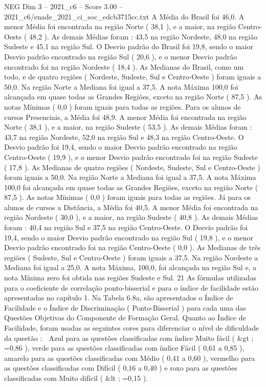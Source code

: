 \begin{textsample}{NEG Dim 3 – 2021\_c6 – Score 3.00 – 2021\_c6/enade\_2021\_ci\_soc\_edcb3715cc.txt}
A Média do Brasil foi 46,0.
A menor Média foi encontrada na região Norte ( 38,1 ), e a maior, na região Centro-Oeste ( 48,2 ).
As demais Médias foram : 43,5 na região Nordeste, 48,0 na região Sudeste e 45,1 na região Sul.
O Desvio padrão do Brasil foi 19,8, sendo o maior Desvio padrão encontrado na região Sul ( 20,6 ), e o menor Desvio padrão encontrado foi na região Nordeste ( 18,4 ).
As Medianas do Brasil, como um todo, e de quatro regiões ( Nordeste, Sudeste, Sul e Centro-Oeste ) foram iguais a 50,0.
Na região Norte a Mediana foi igual a 37,5.
A nota Máxima 100,0 foi alcançada em quase todas as Grandes Regiões, exceto na região Norte ( 87,5 ).
As notas Mínimas ( 0,0 ) foram iguais para todas as regiões.
Para os alunos de cursos Presenciais, a Média foi 48,9.
A menor Média foi encontrada na região Norte ( 38,1 ), e a maior, na região Sudeste ( 53,5 ).
As demais Médias foram : 43,7 na região Nordeste, 52,0 na região Sul e 48,3 na região Centro-Oeste.
O Desvio padrão foi 19,4, sendo o maior Desvio padrão encontrado na região Centro-Oeste ( 19,9 ), e o menor Desvio padrão encontrado foi na região Sudeste ( 17,8 ).
As Medianas de quatro regiões ( Nordeste, Sudeste, Sul e Centro-Oeste ) foram iguais a 50,0.
Na região Norte a Mediana foi igual a 37,5.
A nota Máxima 100,0 foi alcançada em quase todas as Grandes Regiões, exceto na região Norte ( 87,5 ).
As notas Mínimas ( 0,0 ) foram iguais para todas as regiões.
Já para os alunos de cursos a Distância, a Média foi 40,5.
A menor Média foi encontrada na região Nordeste ( 30,0 ), e a maior, na região Sudeste ( 40,8 ).
As demais Médias foram : 40,4 na região Sul e 37,5 na região Centro-Oeste.
O Desvio padrão foi 19,4, sendo o maior Desvio padrão encontrado na região Sul ( 19,8 ), e o menor Desvio padrão encontrado foi na região Centro-Oeste ( 0,0 ).
As Medianas de três regiões ( Sudeste, Sul e Centro-Oeste ) foram iguais a 37,5.
Na região Nordeste a Mediana foi igual a 25,0.
A nota Máxima, 100,0, foi alcançada na região Sul e, a nota Mínima zero foi obtida nas regiões Sudeste e Sul. 21 As fórmulas utilizadas para o coeficiente de correlação ponto-bisserial e para o índice de facilidade estão apresentadas no capítulo 1.
Na Tabela 6.8a, são apresentados o Índice de Facilidade e o Índice de Discriminação ( Ponto-Bisserial ) para cada uma das Questões Objetivas do Componente de Formação Geral.
Quanto ao Índice de Facilidade, foram usadas as seguintes cores para diferenciar o nível de dificuldade da questão :  Azul para as questões classificadas com índice Muito fácil ( \&gt ; =0,86 ), verde para as questões classificadas com índice Fácil ( 0,61 a 0,85 ), amarelo para as questões classificadas com Médio ( 0,41 a 0,60 ), vermelho para as questões classificadas com Difícil ( 0,16 a 0,40 ) e roxo para as questões classificadas com Muito difícil ( \&lt ; =0,15 ).

\end{textsample}
